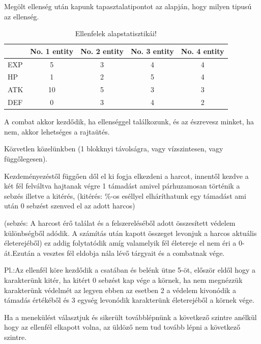 Megölt ellenség után kapunk tapasztalatipontot az alapján, hogy milyen tipusú az ellenség.


\begin{table}[!ht]
\centering
\caption{Ellenfelek alapstatisztikái!}
\label{tab:table2}
\begin{tabular}{|l|c|c|c|c|}
\hline
 & No. 1 entity & No. 2 entity & No. 3 entity & No. 4 entity  \\
\hline
EXP & 5 & 3 & 4 & 4 \\
\hline
HP & 1 & 2 & 5 & 4 \\
\hline
ATK & 10 & 5 & 3 & 3 \\
\hline
DEF & 0 & 3 & 4 & 2 \\
\hline
\end{tabular}
\end{table}


A combat akkor kezdődik, ha ellenséggel találkozunk, és az észrevesz minket, ha nem, akkor lehetséges a rajtaütés.


Közvetlen közelünkben (1 blokknyi távolságra, vagy vízszintesen, vagy függőlegesen).

Kezdeményezéstől függően dől el ki fogja elkezdeni a harcot, innentől kezdve a két fél felváltva hajtanak végre 1 támadást amivel párhuzamosan történik a sebzés illetve a kitérés, (kitérés: \%-os eséllyel elháríthatunk egy támadást ami után 0 sebzést szenved el az adott harcos)

(sebzés: A harcost érő találat és a felszereléséből adott összesített védelem különbségből adódik. A számítás után kapott összeget levonjuk a harcos aktuális életerejéből) ez addig folytatódik amíg valamelyik fél életereje el nem éri a 0-át.Ezután a vesztes fél eldobja nála lévő tárgyait és a combatnak vége.


Pl.:Az ellenfél köre kezdődik a csatában és belénk ütne 5-öt, először eldől hogy a karakterünk kitér, ha kitért 0 sebzést kap vége a körnek, ha nem megnézzük karakterünk védelmét az legyen ebben az esetben 2 a védelem kivonódik a támadás értékéből és 3 egység levonódik karakterünk életerejéből a körnek vége.

Ha a menekülést választjuk és sikerült továbblépnünk a következő szintre anélkül hogy az ellenfél elkapott volna, az üldöző nem tud tovább lépni a következő szintre.

